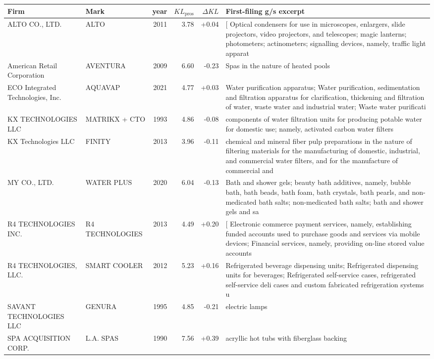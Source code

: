 \begin{tabular}{p{4.0cm}p{2.2cm}rrrp{6.5cm}}
\toprule
Firm & Mark & year & $KL_\text{pros}$ & $\Delta KL$ & First-filing g/s excerpt \\
\midrule
ALTO CO., LTD. & ALTO & 2011 & 3.78 & +0.04 & [ Optical condensers for use in microscopes, enlargers, slide projectors, video projectors, and telescopes; magic lanterns; photometers; actinometers; signalling devices, namely, traffic light apparat \\
American Retail Corporation & AVENTURA & 2009 & 6.60 & -0.23 & Spas in the nature of heated pools \\
ECO Integrated Technologies, Inc. & AQUAVAP & 2021 & 4.77 & +0.03 & Water purification apparatus; Water purification, sedimentation and filtration apparatus for clarification, thickening and filtration of water, waste water and industrial water; Waste water purificati \\
KX TECHNOLOGIES LLC & MATRIKX + CTO & 1993 & 4.86 & -0.08 & components of water filtration units for producing potable water for domestic use; namely, activated carbon water filters \\
KX Technologies LLC & FINITY & 2013 & 3.96 & -0.11 & chemical and mineral fiber pulp preparations in the nature of filtering materials for the manufacturing of domestic, industrial, and commercial water filters, and for the manufacture of commercial and \\
MY CO., LTD. & WATER PLUS & 2020 & 6.04 & -0.13 & Bath and shower gels; beauty bath additives, namely, bubble bath, bath beads, bath foam, bath crystals, bath pearls, and non-medicated bath salts; non-medicated bath salts; bath and shower gels and sa \\
R4 TECHNOLOGIES INC. & R4 TECHNOLOGIES & 2013 & 4.49 & +0.20 & [ Electronic commerce payment services, namely, establishing funded accounts used to purchase goods and services via mobile devices; Financial services, namely, providing on-line stored value accounts \\
R4 TECHNOLOGIES, LLC. & SMART COOLER & 2012 & 5.23 & +0.16 & Refrigerated beverage dispensing units; Refrigerated dispensing units for beverages; Refrigerated self-service cases, refrigerated self-service deli cases and custom fabricated refrigeration systems u \\
SAVANT TECHNOLOGIES LLC & GENURA & 1995 & 4.85 & -0.21 & electric lamps \\
SPA ACQUISITION CORP. & L.A. SPAS & 1990 & 7.56 & +0.39 & acryllic hot tubs with fiberglass backing \\
\bottomrule
\end{tabular}
\clearpage


